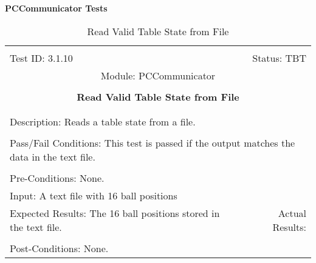\documentclass[titlepage]{article}
\begin{document}
\large{\textbf{PCCommunicator Tests}}
\begin{center}%
\begin{table}[h!]
\begin{tabular}{|l r|}\hline&\\[-2mm]
	Test ID: 3.1.10	&Status: TBT\\[-3mm]
	\multicolumn{2}{|c|}{Module: PCCommunicator}\\&\\
	\multicolumn{2}{|c|}{\textbf{\large{Read Valid Table State from File}}}\\&\\\hline&\\[-3mm]
	\multicolumn{2}{|p{\textwidth}|}{Description: Reads a table state from a file.}\\[1mm]\hline&\\[-3mm]
	\multicolumn{2}{|p{\textwidth}|}{Pass/Fail Conditions: This test is passed if the output matches the data in the text file.}\\[1mm]\hline&\\[-3mm]
	\multicolumn{2}{|p{\textwidth}|}{Pre-Conditions: None.}\\[4mm]
	\multicolumn{2}{|p{\textwidth}|}{Input: A text file with 16 ball positions}\\[2mm]\hline
	\multicolumn{1}{|p{0.49\textwidth}}{Expected Results: The 16 ball positions stored in the text file.}	&\multicolumn{1}{|p{0.45\textwidth}|}{Actual Results: }\\\hline&\\[-3mm]
	\multicolumn{2}{|p{\textwidth}|}{Post-Conditions: None.}\\\hline
\end{tabular}
\caption{Read Valid Table State from File}
\end{table}
\end{center}
\end{document}

